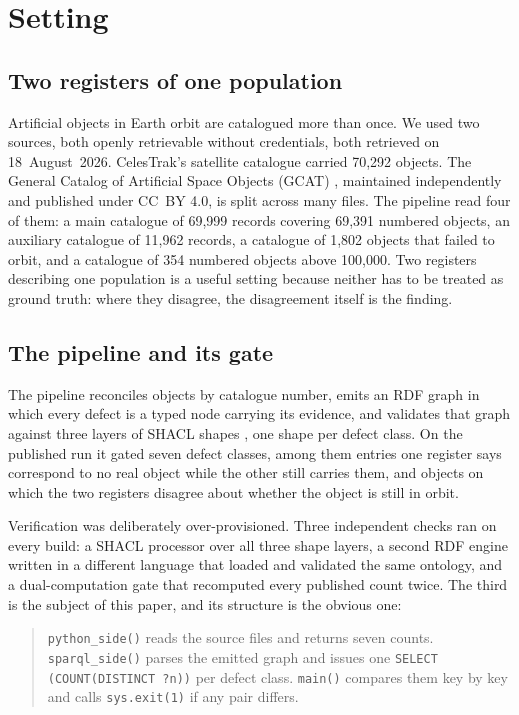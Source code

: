 \section{Setting}

\subsection{Two registers of one population}

Artificial objects in Earth orbit are catalogued more than once. We used two
sources, both openly retrievable without credentials, both retrieved on
18~August~2026. CelesTrak's satellite catalogue \citep{celestrak2026satcat}
carried 70,292 objects. The General Catalog of Artificial Space Objects (GCAT)
\citep{mcdowell2020gcat}, maintained independently and published under CC~BY
4.0, is split across many files. The pipeline read four of them: a main
catalogue of 69,999 records covering 69,391 numbered objects, an auxiliary
catalogue of 11,962 records, a catalogue of 1,802 objects that failed to orbit,
and a catalogue of 354 numbered objects above 100,000. Two registers describing
one population is a useful setting because neither has to be treated as ground
truth: where they disagree, the disagreement itself is the finding.

\subsection{The pipeline and its gate}

The pipeline reconciles objects by catalogue number, emits an RDF graph in which
every defect is a typed node carrying its evidence, and validates that graph
against three layers of SHACL shapes \citep{shacl2017}, one shape per defect
class. On the published run it gated seven defect classes, among them entries
one register says correspond to no real object while the other still carries
them, and objects on which the two registers disagree about whether the object
is still in orbit.

Verification was deliberately over-provisioned. Three independent checks ran on
every build: a SHACL processor over all three shape layers, a second RDF engine
written in a different language that loaded and validated the same ontology, and
a dual-computation gate that recomputed every published count twice. The third
is the subject of this paper, and its structure is the obvious one:

\begin{quote}\small
\texttt{python\_side()} reads the source files and returns seven counts.
\texttt{sparql\_side()} parses the emitted graph and issues one
\texttt{SELECT (COUNT(DISTINCT ?n))} per defect class. \texttt{main()} compares
them key by key and calls \texttt{sys.exit(1)} if any pair differs.
\end{quote}

